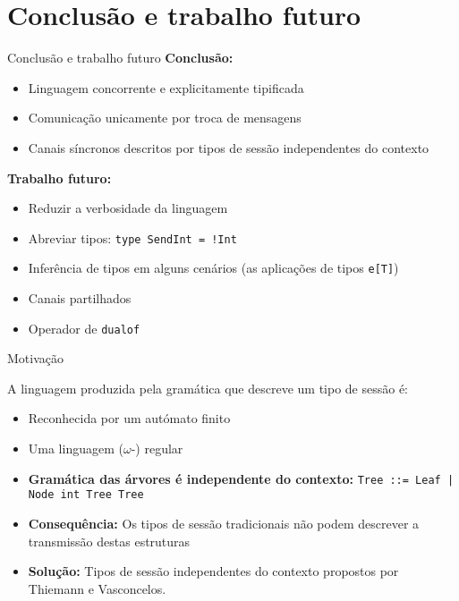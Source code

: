 \section{Conclusão e trabalho futuro}

\begin{frame}[fragile]{Conclusão e trabalho futuro}
  \textbf{Conclusão:}
  \begin{itemize}
  \item Linguagem concorrente e explicitamente tipificada
  \item Comunicação unicamente por troca de mensagens
  \item Canais síncronos descritos por tipos de sessão independentes do contexto
  \end{itemize}
  \textbf{Trabalho futuro:}
  \begin{itemize}
  \item Reduzir a verbosidade da linguagem
  \item Abreviar tipos: \lstinline{type SendInt = !Int}
  \item Inferência de tipos em alguns cenários (as aplicações de tipos \lstinline|e[T]|)
  \item Canais partilhados
  \item Operador de \lstinline|dualof|
  \end{itemize}
\end{frame}

\begin{frame}[fragile]{Motivação}
  \begin{tcolorbox}[colback=blue!5,colframe=blue!60!black,title=Facto,arc=2pt,outer arc=2pt]
    A linguagem produzida pela gramática que descreve um tipo de sessão é:
    \begin{itemize}
    \item Reconhecida por um autómato finito
    \item Uma linguagem ($\omega$-) regular
    \end{itemize}
  \end{tcolorbox}
  \begin{itemize}
  \item \textbf{Gramática das árvores é independente do contexto:} \lstinline"Tree ::= Leaf | Node int Tree Tree" 
  \item \textbf{Consequência:} Os tipos de sessão tradicionais não podem descrever a transmissão destas estruturas 
  \item \textbf{Solução:} Tipos de sessão independentes do contexto propostos por Thiemann e Vasconcelos.
  \end{itemize}
\end{frame}

